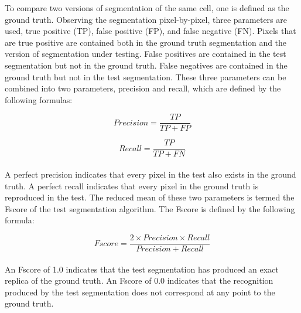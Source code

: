 To compare two versions of segmentation of the same cell, one is defined as the ground truth. Observing the segmentation pixel-by-pixel, three parameters are used, true positive (TP), false positive (FP), and false negative (FN). Pixels that are true positive are contained both in the ground truth segmentation and the version of segmentation under testing. False positives are contained in the test segmentation but not in the ground truth. False negatives are contained in the ground truth but not in the test segmentation. These three parameters can be combined into two parameters, precision and recall, which are defined by the following formulas:

\begin{equation}
Precision = \frac{TP}{TP + FP}
\end{equation}

\begin{equation}
Recall = \frac{TP}{TP + FN}
\end{equation}
\\
A perfect precision indicates that every pixel in the test also exists in the ground truth. A perfect recall indicates that every pixel in the ground truth is reproduced in the test. The reduced mean of these two parameters is termed the Fscore of the test segmentation algorithm. The Fscore is defined by the following formula:

\begin{equation}
Fscore = \frac{2 \times Precision \times Recall}{Precision + Recall}
\end{equation}
\\
An Fscore of 1.0 indicates that the test segmentation has produced an exact replica of the ground truth. An Fscore of 0.0 indicates that the recognition produced by the test segmentation does not correspond at any point to the ground truth.
